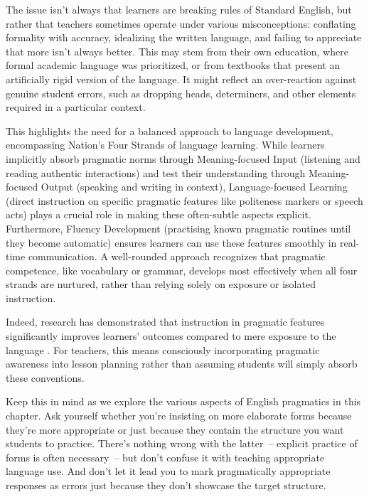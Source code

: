 The issue isn't always that learners are breaking rules of Standard English, but rather that teachers sometimes operate under various misconceptions: conflating formality with accuracy, idealizing the written language, and failing to appreciate that more isn't always better. This may stem from their own education, where formal academic language was prioritized, or from textbooks that present an artificially rigid version of the language. It might reflect an over-reaction against genuine student errors, such as dropping heads, determiners, and other elements required in a particular context.

This highlights the need for a balanced approach to language development, encompassing Nation's Four Strands of language learning. While learners implicitly absorb pragmatic norms through Meaning-focused Input (listening and reading authentic interactions) and test their understanding through Meaning-focused Output (speaking and writing in context), Language-focused Learning (direct instruction on specific pragmatic features like politeness markers or speech acts) plays a crucial role in making these often-subtle aspects explicit. Furthermore, Fluency Development (practising known pragmatic routines until they become automatic) ensures learners can use these features smoothly in real-time communication. A well-rounded approach recognizes that pragmatic competence, like vocabulary or grammar, develops most effectively when all four strands are nurtured, rather than relying solely on exposure or isolated instruction.

Indeed, research has demonstrated that instruction in pragmatic features significantly improves learners' outcomes compared to mere exposure to the language \autocite{JeonKaya2006, RenLiLu2022}. For teachers, this means consciously incorporating pragmatic awareness into lesson planning rather than assuming students will simply absorb these conventions.

Keep this in mind as we explore the various aspects of English pragmatics in this chapter. Ask yourself whether you're insisting on more elaborate forms because they're more appropriate or just because they contain the structure you want students to practice. There's nothing wrong with the latter~-- explicit practice of forms is often necessary~-- but don't confuse it with teaching appropriate language use. And don't let it lead you to mark pragmatically appropriate responses as errors just because they don't showcase the target structure.

